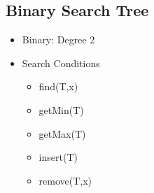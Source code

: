 \documentclass{article}
\begin{document}
\subsection{Binary Search Tree}
\begin{itemize}
\item Binary: Degree 2
\item Search Conditions
\begin{itemize}
    \item find(T,x)
    \item getMin(T)
    \item getMax(T)
    \item insert(T)
    \item remove(T,x)
\end{itemize}
\end{itemize}
\end{document}
